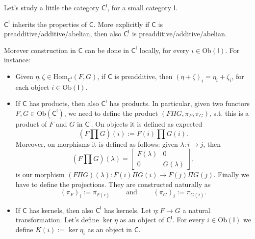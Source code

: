 Let's study a little the category $\mathsf{C}^{\mathsf{I}}$, for a small category $\mathsf{I}$.
\begin{prop}
	$\mathsf{C}^{\mathsf{I}}$ inherits the properties of $\mathsf{C}$.
	More explicitly if $\mathsf{C}$ is preadditive/additive/abelian, then also
	$\mathsf{C}^{\mathsf{I}}$ is preadditive/additive/abelian.
	
	Morever construction in $\mathsf{C}$ can be done in $\mathsf{C}^{\mathsf{I}}$ locally, for every $i \in \mathrm{Ob} \left(\mathsf{I}\right)$.
	For instance:
	\begin{itemize}
		\item Given $\eta, \zeta \in \mathrm{Hom}_{\mathsf{C}^{\mathsf{I}}} \left( F, G \right)$, if $\mathsf{C}$ is preadditive, then
			$\left( \eta + \zeta \right)_i = \eta_i + \zeta_i$, for each object $i \in \mathrm{Ob} \left(\mathsf{I}\right)$.
		\item If $\mathsf{C}$ has products, then also $\mathsf{C}^{\mathsf{I}}$ has products.
			In particular, given two functors $F,G \in \mathrm{Ob} \left(\mathsf{C}^{\mathsf{I}}\right)$, we need to define the product
			$\left(F \Pi G, \pi_F, \pi_G\right)$, s.t. this is a product of $F$ and $G$ in $\mathsf{C}^{\mathsf{I}}$.
			On objects it is defined as expected
			\begin{equation}
				(F \prod G)(i) := F(i) \prod G(i)
			.\end{equation} 
			Moreover, on morphisms it is defined as follows: given $\lambda: i \to j$, then
			\begin{equation}
				\left( F \prod G \right)(\lambda) = 
				\begin{bmatrix}
					F(\lambda) & 0\\
					0 & G(\lambda)
				\end{bmatrix} 
			,\end{equation} 
			is our morphism $\left( F \Pi G \right)(\lambda): F(i) \Pi G(i) \to F(j) \Pi G(j)$.
			Finally we have to define the projections.
			They are constructed naturally as
			\begin{equation}
				(\pi_F)_i := \pi_{F(i)} \qquad \text{ and } \qquad \left( \pi_G \right)_i := \pi_{G(i)}
			.\end{equation} 
		\item If $\mathsf{C}$ has kernels, then also $\mathsf{C}^{\mathsf{I}}$ has kernels.
			Let $\eta: F \to G$ a natural transformation.
			Let's define $\ker \eta$ as an object of $\mathsf{C}^{\mathsf{I}}$.
			For every $i \in \mathrm{Ob} \left(\mathsf{I}\right)$ we define $K(i) := \ker \eta_i$ as an object in $\mathsf{C}$.

\end{itemize}
\end{prop}
